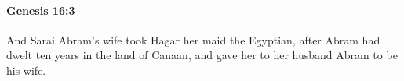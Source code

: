 
		\paragraph{Genesis 16:3} %
			\label{GENESIS-16-3}

			And Sarai Abram's wife took Hagar her maid the Egyptian, after Abram had dwelt ten years in the land of Canaan, and gave her to her husband Abram to be his wife.



